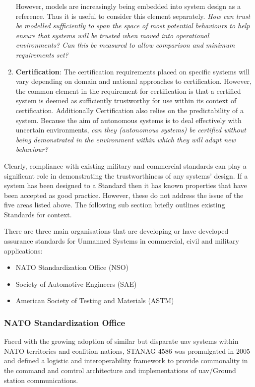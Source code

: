 \begin{enumerate}
    However, models are increasingly being embedded into system design as a reference.
    Thus it is useful to consider this element separately.
    \textit{How can trust be modelled sufficiently to span the space of most potential behaviours to help ensure that systems will be trusted when moved into operational environments?
    Can this be measured to allow comparison and minimum requirements set?}
  \item \textbf{Certification}: The certification requirements placed on specific systems will vary depending on domain and national approaches to certification.
    However, the common element in the requirement for certification is that a certified system is deemed as sufficiently trustworthy for use within its context of certification.
    Additionally Certification also relies on the predictability of a system.
    Because the aim of autonomous systems is to deal effectively with uncertain environments, \textit{can they (autonomous systems) be certified without being demonstrated in the environment within which they will adapt new behaviour?}
\end{enumerate}

Clearly, compliance with existing military and commercial standards can play a significant role in demonstrating the trustworthiness of any systems’ design.
If a system has been designed to a Standard then it has known properties that have been accepted as good practice.
However, these do not address the issue of the five areas listed above.
The following sub section briefly outlines existing Standards for context.

There are three main organisations that are developing or have developed assurance standards for Unmanned Systems in commercial, civil and military applications:
\begin{itemize}
  \item NATO Standardization Office (NSO)
  \item Society of Automotive Engineers (SAE)
  \item American Society of Testing and Materials (ASTM)
\end{itemize}

\subsubsection{NATO Standardization Office}

Faced with the growing adoption of similar but disparate \gls{uav} systems within NATO territories and coalition nations, STANAG 4586\cite{STANAG4586} was promulgated in 2005 and defined a logistic and interoperability framework to provide commonality in the command and comtrol architecture and implementations of \gls{uav}/Ground station communications.

